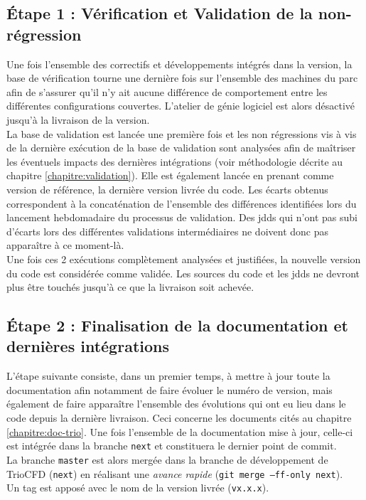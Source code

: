 \subsection{Étape 1 : Vérification et Validation de la non-r\'egression}
Une fois l'ensemble des correctifs et développements intégrés dans la version,
la base de vérification tourne une dernière fois sur l'ensemble des machines
du parc afin de s'assurer qu'il n'y ait aucune différence de comportement
entre les différentes configurations couvertes.
L'atelier de génie logiciel est alors désactivé jusqu'à la livraison de la version.\\
La base de validation est lancée une première fois et les non régressions
vis à vis de la dernière exécution de la base de validation sont analysées
afin de maîtriser les éventuels impacts des dernières intégrations
(voir méthodologie décrite au chapitre \ref{chapitre:validation}).
Elle est également lancée en prenant comme version de référence, la dernière version livrée du code.
Les écarts obtenus correspondent à la concaténation de l'ensemble des différences
identifiées lors du lancement hebdomadaire du processus de validation.
Des jdds qui n'ont pas subi d'écarts lors des différentes validations
intermédiaires ne doivent donc pas apparaître à ce moment-là.\\
Une fois ces 2 exécutions complètement analysées et justifiées,
la nouvelle version du code est considérée comme validée.
Les sources du code et les jdds ne devront plus être touchés jusqu'à ce que la livraison soit achevée.

\subsection{Étape 2 : Finalisation de la documentation et dernières intégrations}
L'étape suivante consiste, dans un premier temps, à mettre à jour toute
la documentation afin notamment de faire évoluer le numéro de version,
mais également de faire apparaître l'ensemble des évolutions qui ont eu lieu
dans le code depuis la dernière livraison.
Ceci concerne les documents cités au chapitre \ref{chapitre:doc-trio}.
Une fois l'ensemble de la documentation mise à jour, celle-ci est intégrée dans la branche \texttt{next}
et constituera le dernier point de commit.\\

La branche \texttt{master} est alors merg\'ee dans la branche de développement de TrioCFD (\texttt{next})
en r\'ealisant une \emph{avance rapide} (\texttt{git merge --ff-only next}).\\
Un tag est apposé avec le nom de la version livrée (\texttt{vx.x.x}).

